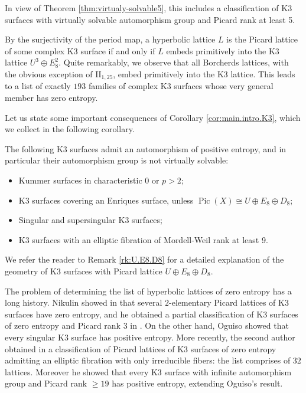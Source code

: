 \documentclass[11pt,letterpaper]{amsart}
\DeclareMathOperator{\Pic}{Pic}
\begin{document}
In view of Theorem \ref{thm:virtualy-solvable5}, this includes a classification of K3 surfaces with virtually solvable automorphism group and Picard rank at least 5.

By the surjectivity of the period map, a hyperbolic lattice $L$ is the Picard lattice of some complex K3 surface if and only if $L$ embeds primitively into the K3 lattice $U^3\oplus E_8^2$. Quite remarkably, we observe that all Borcherds lattices, with the obvious exception of $\mathrm{II}_{1,25}$, embed primitively into the K3 lattice.
This leads to a list of exactly $193$ families of complex K3 surfaces whose very general member has zero entropy.

Let us state some important consequences of Corollary \ref{cor:main.intro.K3}, which we collect in the following corollary.

\begin{corollary} \label{cor:main.consequences}
The following K3 surfaces admit an automorphism of positive entropy, and in particular their automorphism group is not virtually solvable: 
\begin{itemize}
    \item Kummer surfaces in characteristic $0$ or $p>2$;
    \item K3 surfaces covering an Enriques surface, unless $\Pic(X)\cong U\oplus E_8\oplus D_8$;
    \item Singular and supersingular K3 surfaces;
    \item K3 surfaces with an elliptic fibration of Mordell-Weil rank at least 9.
\end{itemize}
\end{corollary}

We refer the reader to Remark \ref{rk:U.E8.D8} for a detailed explanation of the geometry of K3 surfaces with Picard lattice $U\oplus E_8\oplus D_8$.

The problem of determining the list of hyperbolic lattices of zero entropy has a long history. Nikulin showed in \cite{nikulin.finite.aut.greater.5} that several $2$-elementary Picard lattices of K3 surfaces have zero entropy, and he obtained a partial classification of K3 surfaces of zero entropy and Picard rank $3$ in \cite[Theorem~3~and~the~subsequent~discussion]{nikulin.interesting}. On the other hand, Oguiso \cite[Theorem~1.6]{oguiso.entropy} showed that every singular K3 surface has positive entropy.
More recently, the second author obtained in \cite[Theorem~6.12]{mezzedimi.entropy} a classification of Picard lattices of K3 surfaces of zero entropy admitting an elliptic fibration with only irreducible fibers: the list comprises of $32$ lattices. Moreover he showed that every K3 surface with infinite automorphism group and Picard rank $\ge 19$ has positive entropy, extending Oguiso's result.
\end{document}
